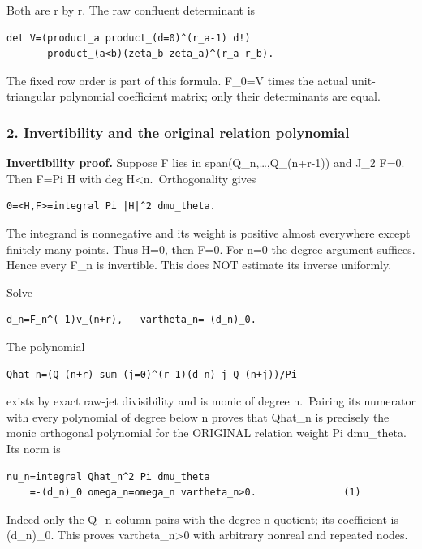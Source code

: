 Both are r by r. The raw confluent determinant is

\begin{verbatim}
det V=(product_a product_(d=0)^(r_a-1) d!)
       product_(a<b)(zeta_b-zeta_a)^(r_a r_b).
\end{verbatim}

The fixed row order is part of this formula. F\_0=V times the actual unit-triangular polynomial coefficient matrix; only their determinants are equal.

\subsubsection{2. Invertibility and the original relation polynomial}\label{endpoint-pr24_current_corrected--invertibility-and-the-original-relation-polynomial}

\textbf{Invertibility proof.} Suppose F lies in span(Q\_n,\ldots,Q\_(n+r-1)) and J\_2 F=0. Then F=Pi H with deg H\textless n.~Orthogonality gives

\begin{verbatim}
0=<H,F>=integral Pi |H|^2 dmu_theta.
\end{verbatim}

The integrand is nonnegative and its weight is positive almost everywhere except finitely many points. Thus H=0, then F=0. For n=0 the degree argument suffices. Hence every F\_n is invertible. This does NOT estimate its inverse uniformly.

Solve

\begin{verbatim}
d_n=F_n^(-1)v_(n+r),   vartheta_n=-(d_n)_0.
\end{verbatim}

The polynomial

\begin{verbatim}
Qhat_n=(Q_(n+r)-sum_(j=0)^(r-1)(d_n)_j Q_(n+j))/Pi
\end{verbatim}

exists by exact raw-jet divisibility and is monic of degree n.~Pairing its numerator with every polynomial of degree below n proves that Qhat\_n is precisely the monic orthogonal polynomial for the ORIGINAL relation weight Pi dmu\_theta. Its norm is

\begin{verbatim}
nu_n=integral Qhat_n^2 Pi dmu_theta
    =-(d_n)_0 omega_n=omega_n vartheta_n>0.               (1)
\end{verbatim}

Indeed only the Q\_n column pairs with the degree-n quotient; its coefficient is -(d\_n)\_0. This proves vartheta\_n\textgreater0 with arbitrary nonreal and repeated nodes.

